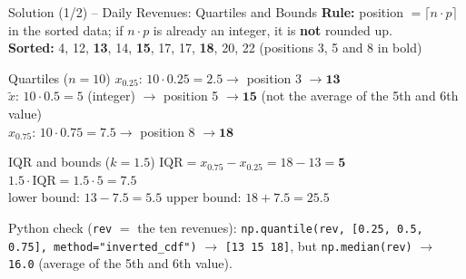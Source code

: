 \documentclass[aspectratio=169,11pt]{beamer}
\begin{document}
\begin{frame}{Solution (1/2) -- Daily Revenues: Quartiles and Bounds}
  \textbf{Rule:} position $= \lceil n \cdot p \rceil$ in the sorted data; if
  $n \cdot p$ is already an integer, it is \textbf{not} rounded up.\\[3pt]
  \textbf{Sorted:} 4, 12, \textbf{13}, 14, \textbf{15}, 17, 17, \textbf{18}, 20, 22
  \quad (positions 3, 5 and 8 in bold)
  \begin{block}{Quartiles ($n = 10$)}
    $x_{0.25}$: $10 \cdot 0.25 = 2.5 \rightarrow$ position 3 $\rightarrow \mathbf{13}$ \\
    $\tilde{x}$: $10 \cdot 0.5 = 5$ (integer) $\rightarrow$ position 5
    $\rightarrow \mathbf{15}$ \quad (not the average of the 5th and 6th value) \\
    $x_{0.75}$: $10 \cdot 0.75 = 7.5 \rightarrow$ position 8 $\rightarrow \mathbf{18}$
  \end{block}
  \begin{block}{IQR and bounds ($k = 1.5$)}
    $\text{IQR} = x_{0.75} - x_{0.25} = 18 - 13 = \mathbf{5}$ \qquad
    $1.5 \cdot \text{IQR} = 1.5 \cdot 5 = 7.5$ \\
    lower bound: $13 - 7.5 = \mathbf{5.5}$ \qquad
    upper bound: $18 + 7.5 = \mathbf{25.5}$
  \end{block}
  \vspace{-0.1cm}
  \footnotesize Python check (\texttt{rev} $=$ the ten revenues):
  \texttt{np.quantile(rev, [0.25, 0.5, 0.75], method="inverted\_cdf")}
  $\rightarrow$ \texttt{[13 15 18]}, but \texttt{np.median(rev)} $\rightarrow$
  \texttt{16.0} (average of the 5th and 6th value).
\end{frame}
\end{document}
